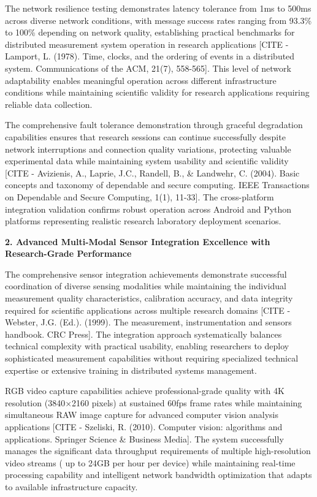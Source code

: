 \documentclass[12pt,a4paper]{report}
\begin{document}
The network resilience testing demonstrates latency tolerance from 1ms to 500ms across diverse network conditions, with
message success rates ranging from 93.3\% to 100\% depending on network quality, establishing practical benchmarks for
distributed measurement system operation in research
applications [CITE - Lamport, L. (1978). Time, clocks, and the ordering of events in a distributed system. Communications of the ACM, 21(7), 558-565].
This level of network adaptability enables meaningful operation across different infrastructure conditions while
maintaining scientific validity for research applications requiring reliable data collection.

The comprehensive fault tolerance demonstration through graceful degradation capabilities ensures that research sessions
can continue successfully despite network interruptions and connection quality variations, protecting valuable
experimental data while maintaining system usability and scientific
validity [CITE - Avizienis, A., Laprie, J.C., Randell, B., \& Landwehr, C. (2004). Basic concepts and taxonomy of dependable and secure computing. IEEE Transactions on Dependable and Secure Computing, 1(1), 11-33].
The cross-platform integration validation confirms robust operation across Android and Python platforms representing
realistic research laboratory deployment scenarios.

\textbf{2. Advanced Multi-Modal Sensor Integration Excellence with Research-Grade Performance}

The comprehensive sensor integration achievements demonstrate successful coordination of diverse sensing modalities
while maintaining the individual measurement quality characteristics, calibration accuracy, and data integrity required
for scientific applications across multiple research
domains [CITE - Webster, J.G. (Ed.). (1999). The measurement, instrumentation and sensors handbook. CRC Press]. The
integration approach systematically balances technical complexity with practical usability, enabling researchers to
deploy sophisticated measurement capabilities without requiring specialized technical expertise or extensive training in
distributed systems management.

RGB video capture capabilities achieve professional-grade quality with 4K resolution (3840×2160 pixels) at sustained
60fps frame rates while maintaining simultaneous RAW image capture for advanced computer vision analysis
applications [CITE - Szeliski, R. (2010). Computer vision: algorithms and applications. Springer Science \& Business Media].
The system successfully manages the significant data throughput requirements of multiple high-resolution video streams (
up to 24GB per hour per device) while maintaining real-time processing capability and intelligent network bandwidth
optimization that adapts to available infrastructure capacity.
\end{document}
